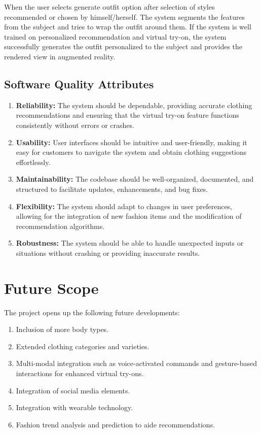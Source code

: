 		When the user selects generate outfit option after selection of styles recommended or chosen by himself/herself. The system segments the features from the subject and tries to wrap the outfit around them. If the system is well trained on personalized recommendation and virtual try-on, the system successfully generates the outfit personalized to the subject and provides the rendered view in augmented reality.

	\subsection{Software Quality Attributes}
		\begin{enumerate}
			\item \textbf{Reliability:} The system should be dependable, providing accurate clothing recommendations and ensuring that the virtual try-on feature functions consistently without errors or crashes.
			\item \textbf{Usability:} User interfaces should be intuitive and user-friendly, making it easy for customers to navigate the system and obtain clothing suggestions effortlessly.
			\item \textbf{Maintainability:} The codebase should be well-organized, documented, and structured to facilitate updates, enhancements, and bug fixes.
			\item \textbf{Flexibility:} The system should adapt to changes in user preferences, allowing for the integration of new fashion items and the modification of recommendation algorithms.
			\item \textbf{Robustness:} The system should be able to handle unexpected inputs or situations without crashing or providing inaccurate results.
		\end{enumerate}

\section{Future Scope}
	The project opens up the following future developments:

	\begin{enumerate}
		\item Inclusion of more body types.
		\item Extended clothing categories and varieties.
		\item Multi-modal integration such as voice-activated commands and gesture-based interactions for enhanced virtual try-ons.
		\item Integration of social media elements.
		\item Integration with wearable technology.
		\item Fashion trend analysis and prediction to aide recommendations.
	\end{enumerate}
